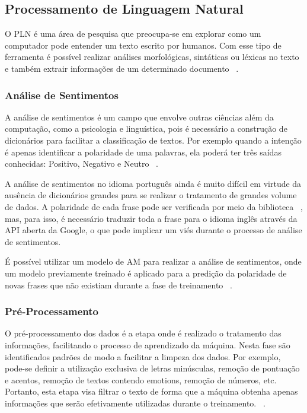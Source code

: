   \subsection{Processamento de Linguagem Natural}

          O \acrshort{PLN} é uma área de pesquisa que preocupa-se em explorar como um computador pode entender um texto escrito por humanos. Com esse tipo 
          de ferramenta é possível realizar análises morfológicas, sintáticas ou léxicas no texto e também extrair informações de um determinado
          documento ~\cite{liddy2001natural}. 

          \subsubsection{Análise de Sentimentos}

          A análise de sentimentos é um campo que envolve outras ciências além da computação, como a psicologia e linguística, pois é necessário 
          a construção de dicionários para facilitar a classificação de textos. Por exemplo quando a intenção é apenas identificar a polaridade
          de uma palavras, ela poderá ter três saídas conhecidas: Positivo, Negativo e Neutro ~\cite{wegrzyn2012tweets}. 
          


          A análise de sentimentos no idioma português ainda é muito difícil em virtude da ausência de dicionários grandes para se realizar o tratamento de grandes volume de dados. 
          A polaridade de cada frase pode ser verificada por meio da biblioteca ~\cite{textblob},
           mas, para isso, é necessário traduzir toda a frase para o idioma inglês através da API aberta da Google, 
           o que pode implicar um viés durante o processo de análise de sentimentos.
          
          É possível utilizar um modelo de \acrshort{AM} para realizar a análise de sentimentos, onde um modelo previamente treinado é aplicado para a predição da polaridade de novas frases que não existiam durante a fase de treinamento ~\cite{golbeck2010twitter}.
          
          
        \subsubsection{Pré-Processamento}

O pré-processamento dos dados é a etapa onde é realizado o tratamento das informações, facilitando o processo de aprendizado da máquina. Nesta fase são identificados padrões de modo a facilitar a limpeza dos dados. Por exemplo, pode-se definir a utilização exclusiva de letras minúsculas, remoção de pontuação e acentos, remoção de textos contendo emotions, remoção de números, etc. Portanto, esta etapa visa filtrar o texto de forma que a máquina obtenha apenas informações que serão efetivamente utilizadas durante o treinamento. ~\cite{ferreirametodo}.

